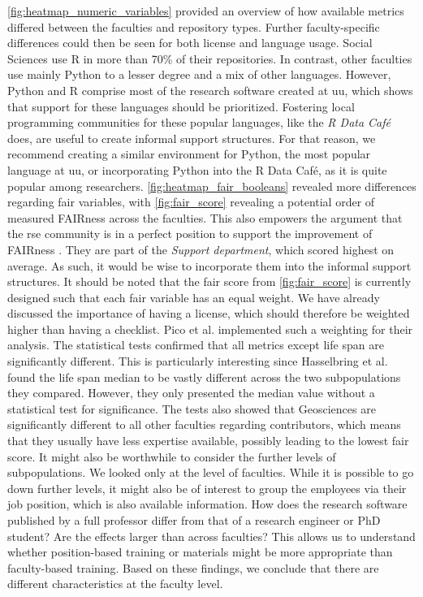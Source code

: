 \autoref{fig:heatmap_numeric_variables} provided an overview of how available metrics differed between the faculties and repository types. Further faculty-specific differences could then be seen for both license and language usage. 
Social Sciences use R in more than 70\% of their repositories. In contrast, other faculties use mainly Python to a lesser degree and a mix of other languages. However, Python and R comprise most of the research software created at \acrshort{uu}, which shows that support for these languages should be prioritized. Fostering local programming communities for these popular languages, like the \textit{R Data Café} \cite{noauthor_r_nodate} does, are useful to create informal support structures. For that reason, we recommend creating a similar environment for Python, the most popular language at \acrshort{uu}, or incorporating Python into the R Data Café, as it is quite popular among researchers. 
\autoref{fig:heatmap_fair_booleans} revealed more differences regarding \acrshort{fair} variables, with \autoref{fig:fair_score} revealing a potential order of measured FAIRness across the faculties. This also empowers the argument that the \acrshort{rse} community is in a perfect position to support the improvement of FAIRness \cite{hasselbring_fair_2020}. They are part of the \textit{Support department}, which scored highest on average. As such, it would be wise to incorporate them into the informal support structures. 
It should be noted that the \acrshort{fair} score from \autoref{fig:fair_score} is currently designed such that each \acrshort{fair} variable has an equal weight. We have already discussed the importance of having a license, which should therefore be weighted higher than having a checklist. Pico et al. \cite{pico_fairsoft_2022} implemented such a weighting for their analysis.
The statistical tests confirmed that all metrics except life span are significantly different. This is particularly interesting since Hasselbring et al. \cite{hasselbring_open_2020} found the life span median to be vastly different across the two subpopulations they compared. However, they only presented the median value without a statistical test for significance. 
The tests also showed that Geosciences are significantly different to all other faculties regarding contributors, which means that they usually have less expertise available, possibly leading to the lowest \acrshort{fair} score.
It might also be worthwhile to consider the further levels of subpopulations. We looked only at the level of faculties. While it is possible to go down further levels, it might also be of interest to group the employees via their job position, which is also available information. How does the research software published by a full professor differ from that of a research engineer or PhD student? Are the effects larger than across faculties? This allows us to understand whether position-based training or materials might be more appropriate than faculty-based training. 
Based on these findings, we conclude that there are different characteristics at the faculty level. 

